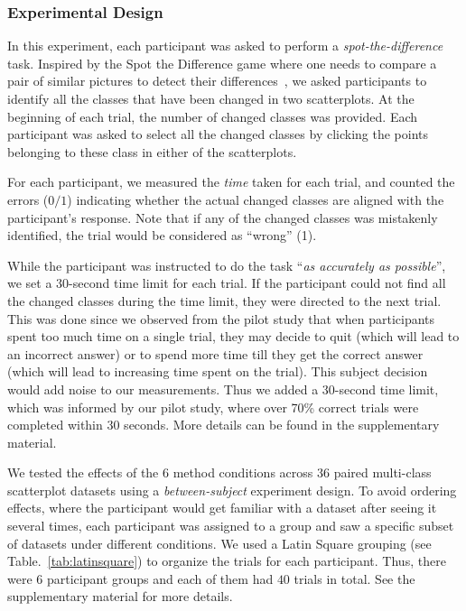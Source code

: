 \subsubsection{Experimental Design}

\vspace{.3em}
In this experiment, each participant was asked to perform a \emph{spot-the-difference} task. Inspired by the Spot the Difference game where one needs to compare a pair of similar pictures to detect their differences~\cite{Fukuba2009}, we asked participants to identify all the classes that have been changed in two scatterplots. At the beginning of each trial, the number of changed classes was provided. Each participant was asked to select all the changed classes by clicking the points belonging to these class in either of the scatterplots.

For each participant, we measured the \emph{time} taken for each trial, and counted the  errors ($0/1$) indicating whether the actual changed classes are aligned with the participant's response. Note that if any of the changed classes was mistakenly identified, the trial would be considered as ``wrong'' (1).

While the participant was instructed to do the task ``\emph{as accurately as possible}'', we set a 30-second time limit for each trial. If the participant could not find all the changed classes during the time limit, they were directed to the next trial.
This was done since we observed from the pilot study that when participants spent too much time on a single trial, they may decide to quit (which will lead to an incorrect answer) or to spend more time till they get the correct answer (which will lead to increasing time spent on the trial). This subject decision would add noise to our measurements. Thus we added a 30-second time limit, which was informed by our pilot study, where over 70\% correct trials were completed within $30$ seconds. More details can be found in the supplementary material.

\vspace{.3em}
 We tested the effects of the $6$ method conditions across $36$ paired multi-class scatterplot datasets using a \emph{between-subject} experiment design. To avoid ordering effects, where the participant would get familiar with a dataset after seeing it several times, each participant was assigned to a group and saw a specific subset of datasets under different conditions. We used a Latin Square grouping (see Table.~\ref{tab:latinsquare}) to organize the trials for each participant. Thus, there were $6$ participant groups and each of them had $40$ trials in total. See the supplementary material for more details.

